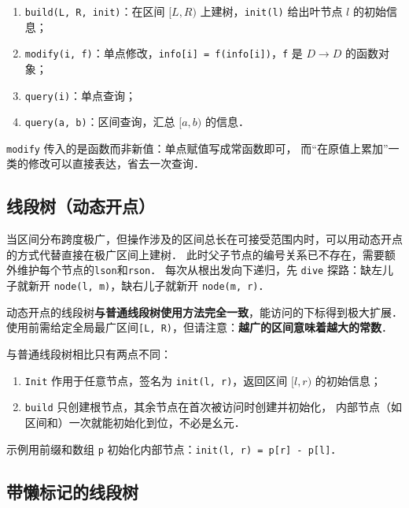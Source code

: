\begin{enumerate}[noitemsep]
    \item {\tt build(L, R, init)}：在区间 $[L, R)$ 上建树，{\tt init(l)} 给出叶节点 $l$ 的初始信息；
    \item {\tt modify(i, f)}：单点修改，{\tt info[i] = f(info[i])}，{\tt f} 是 $D \rightarrow D$ 的函数对象；
    \item {\tt query(i)}：单点查询；
    \item {\tt query(a, b)}：区间查询，汇总 $[a, b)$ 的信息．
\end{enumerate}

{\tt modify} 传入的是函数而非新值：单点赋值写成常函数即可，
而“在原值上累加”一类的修改可以直接表达，省去一次查询．



\subsection{线段树（动态开点）}

当区间分布跨度极广，但操作涉及的区间总长在可接受范围内时，可以用动态开点的方式代替直接在极广区间上建树．
此时父子节点的编号关系已不存在，需要额外维护每个节点的{\tt lson}和{\tt rson}．
每次从根出发向下递归，先 {\tt dive} 探路：缺左儿子就新开 {\tt node(l, m)}，缺右儿子就新开 {\tt node(m, r)}．

动态开点的线段树{\bf 与普通线段树使用方法完全一致}，能访问的下标得到极大扩展．
使用前需给定全局最广区间{\tt [L, R)}，但请注意：{\bf 越广的区间意味着越大的常数}．

与普通线段树相比只有两点不同：

\begin{enumerate}[noitemsep]
    \item {\tt Init} 作用于任意节点，签名为 {\tt init(l, r)}，返回区间 $[l, r)$ 的初始信息；
    \item {\tt build} 只创建根节点，其余节点在首次被访问时创建并初始化，
        内部节点（如区间和）一次就能初始化到位，不必是幺元．
\end{enumerate}

示例用前缀和数组 {\tt p} 初始化内部节点：{\tt init(l, r) = p[r] - p[l]}．



\subsection{带懒标记的线段树}

